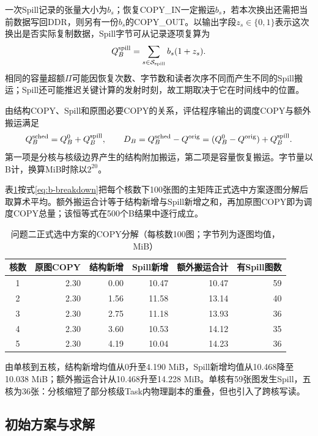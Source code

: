 一次Spill记录的张量大小为$b_s$；恢复COPY\_IN一定搬运$b_s$，若本次换出还需把当前数据写回DDR，则另有一份$b_s$的COPY\_OUT。以输出字段$z_s\in\{0,1\}$表示这次换出是否实际复制数据，Spill字节可从记录逐项复算为
\begin{equation}
Q_B^{\rm spill}=\sum_{s\in\mathcal S_{\rm spill}} b_s(1+z_s).
\label{eq:b-spill}
\end{equation}
相同的容量超额$\Pi$可能因恢复次数、字节数和读者次序不同而产生不同的Spill搬运；Spill还可能推迟关键计算的发射时刻，故工期取决于它在时间线中的位置。

由结构COPY、Spill和原图必要COPY的关系，评估程序输出的调度COPY与额外搬运满足
\begin{equation}
Q_B^{\rm sched}=Q_B^0+Q_B^{\rm spill},\qquad
D_B=Q_B^{\rm sched}-Q^{\rm orig}
=(Q_B^0-Q^{\rm orig})+Q_B^{\rm spill}.
\label{eq:b-breakdown}
\end{equation}
第一项是分核与核级边界产生的结构附加搬运，第二项是容量恢复搬运。字节量以B计，换算MiB时除以$2^{20}$。

表\ref{tab:b-copy-ledger}按式\eqref{eq:b-breakdown}把每个核数下100张图的主矩阵正式选中方案逐图分解后取算术平均。额外搬运合计等于结构新增与Spill新增之和，再加原图COPY即为调度COPY总量；该恒等式在500个B结果中逐行成立。

\begin{table}[H]\centering\small
\caption{问题二正式选中方案的COPY分解（每核数100图；字节列为逐图均值，MiB）}\label{tab:b-copy-ledger}
\begin{tabular}{crrrrr}\toprule
核数 & 原图COPY & 结构新增 & Spill新增 & 额外搬运合计 & 有Spill图数\\\midrule
1 & 2.30 & 0.00 & 10.47 & 10.47 & 59\\
2 & 2.30 & 1.56 & 11.58 & 13.14 & 40\\
3 & 2.30 & 2.75 & 11.18 & 13.93 & 36\\
4 & 2.30 & 3.60 & 10.53 & 14.12 & 35\\
5 & 2.30 & 4.19 & 10.04 & 14.23 & 36\\\bottomrule
\end{tabular}\end{table}

由单核到五核，结构新增均值从0升至4.190 MiB，Spill新增均值从10.468降至10.038 MiB；额外搬运合计从10.468升至14.228 MiB。单核有59张图发生Spill，五核为36张：分核缩短了部分核级Task内物理副本的重叠，但也引入了跨核写读。

\subsection{初始方案与求解}
